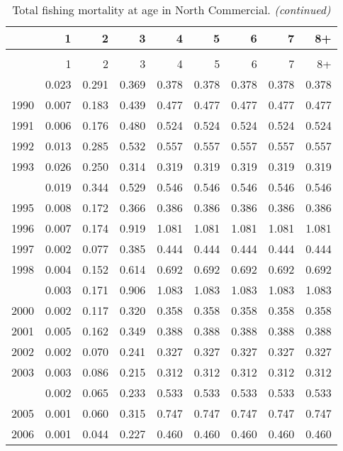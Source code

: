 \documentclass[
]{article}
\begin{document}
\begin{longtable}[t]{lrrrrrrrr}
\caption{\label{tab:North_Commercial-fleet-FAA-table}Total fishing mortality at age in North Commercial.}\\
\toprule
  & 1 & 2 & 3 & 4 & 5 & 6 & 7 & 8+\\
\midrule
\endfirsthead
\caption[]{Total fishing mortality at age in North Commercial. \textit{(continued)}}\\
\toprule
  & 1 & 2 & 3 & 4 & 5 & 6 & 7 & 8+\\
\midrule
\endhead

\endfoot
\bottomrule
\endlastfoot
1989 & 0.023 & 0.291 & 0.369 & 0.378 & 0.378 & 0.378 & 0.378 & 0.378\\
1990 & 0.007 & 0.183 & 0.439 & 0.477 & 0.477 & 0.477 & 0.477 & 0.477\\
1991 & 0.006 & 0.176 & 0.480 & 0.524 & 0.524 & 0.524 & 0.524 & 0.524\\
1992 & 0.013 & 0.285 & 0.532 & 0.557 & 0.557 & 0.557 & 0.557 & 0.557\\
1993 & 0.026 & 0.250 & 0.314 & 0.319 & 0.319 & 0.319 & 0.319 & 0.319\\
\addlinespace
1994 & 0.019 & 0.344 & 0.529 & 0.546 & 0.546 & 0.546 & 0.546 & 0.546\\
1995 & 0.008 & 0.172 & 0.366 & 0.386 & 0.386 & 0.386 & 0.386 & 0.386\\
1996 & 0.007 & 0.174 & 0.919 & 1.081 & 1.081 & 1.081 & 1.081 & 1.081\\
1997 & 0.002 & 0.077 & 0.385 & 0.444 & 0.444 & 0.444 & 0.444 & 0.444\\
1998 & 0.004 & 0.152 & 0.614 & 0.692 & 0.692 & 0.692 & 0.692 & 0.692\\
\addlinespace
1999 & 0.003 & 0.171 & 0.906 & 1.083 & 1.083 & 1.083 & 1.083 & 1.083\\
2000 & 0.002 & 0.117 & 0.320 & 0.358 & 0.358 & 0.358 & 0.358 & 0.358\\
2001 & 0.005 & 0.162 & 0.349 & 0.388 & 0.388 & 0.388 & 0.388 & 0.388\\
2002 & 0.002 & 0.070 & 0.241 & 0.327 & 0.327 & 0.327 & 0.327 & 0.327\\
2003 & 0.003 & 0.086 & 0.215 & 0.312 & 0.312 & 0.312 & 0.312 & 0.312\\
\addlinespace
2004 & 0.002 & 0.065 & 0.233 & 0.533 & 0.533 & 0.533 & 0.533 & 0.533\\
2005 & 0.001 & 0.060 & 0.315 & 0.747 & 0.747 & 0.747 & 0.747 & 0.747\\
2006 & 0.001 & 0.044 & 0.227 & 0.460 & 0.460 & 0.460 & 0.460 & 0.460\\

\end{longtable}
\end{document}
